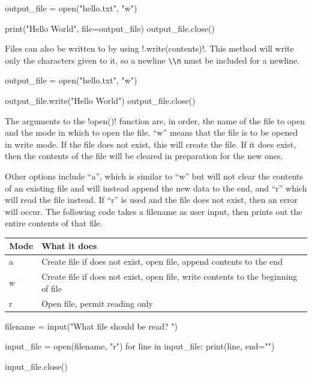 \documentclass[11pt]{cselabheader}
\begin{document}
\begin{python3code}
output_file = open("hello.txt", "w")

print("Hello World", file=output_file)
output_file.close()
\end{python3code}

Files can also be written to by using \pythoninline!.write(contents)!. This
method will write only the characters given to it, so a newline \lstinline{\\n}
must be included for a newline.

\begin{python3code}
output_file = open("hello.txt", "w")

output_file.write("Hello World\n")
output_file.close()
\end{python3code}

The arguments to the \pythoninline!open()! function are, in order, the name of
the file to open and the mode in which to open the file. ``w'' means that the
file is to be opened in write mode. If the file does not exist, this will create
the file. If it does exist, then the contents of the file will be cleared in
preparation for the new ones.

Other options include ``a'', which is similar to ``w'' but will not clear the
contents of an existing file and will instead append the new data to the end,
and ``r'' which will read the file instead. If ``r'' is used and the file does
not exist, then an error will occur. The following code takes a filename as user
input, then prints out the entire contents of that file.

\begin{table}[!ht]
  \centering
  \begin{tabular}{ll}
    Mode & What it does \\
    \midrule
    a & Create file if does not exist, open file, append contents to the end \\
    w & Create file if does not exist, open file, write contents to the beginning
    of file \\
    r & Open file, permit reading only \\
  \end{tabular}
\end{table}

\begin{python3code}
filename = input("What file should be read? ")

input_file = open(filename, "r")
for line in input_file:
    print(line, end="")

input_file.close()
\end{python3code}
\end{document}
